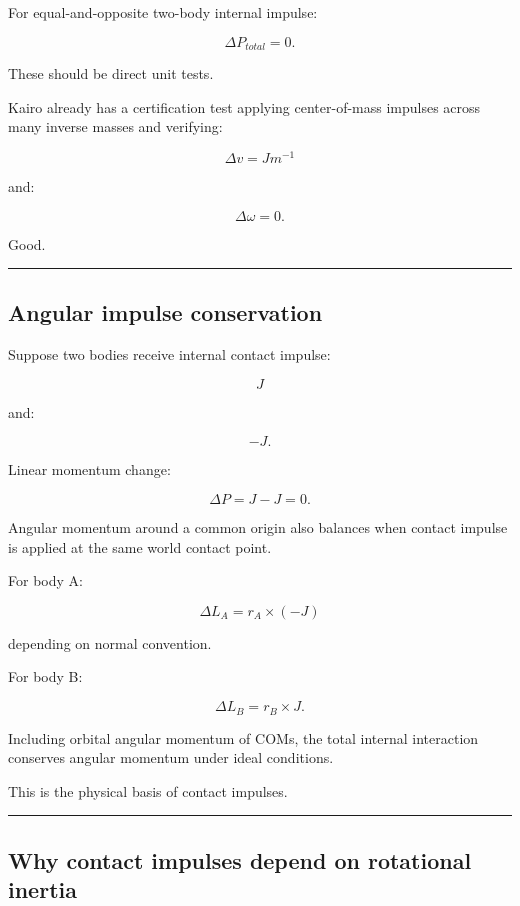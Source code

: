 For equal-and-opposite two-body internal impulse:

\[
\Delta P_{total}=0.
\]

These should be direct unit tests.

Kairo already has a certification test applying center-of-mass impulses across many inverse masses and verifying:

\[
\Delta v=Jm^{-1}
\]

and:

\[
\Delta\omega=0.
\]

Good.

\begin{center}\rule{0.5\linewidth}{0.5pt}\end{center}

\subsection{Angular impulse conservation}\label{06-engine-ii-ch038-angular-impulse-conservation}

\hypertarget{06-engine-ii-ch038-angular-impulse-conservation}{}

Suppose two bodies receive internal contact impulse:

\[
J
\]

and:

\[
-J.
\]

Linear momentum change:

\[
\Delta P
=
J-J
=
0.
\]

Angular momentum around a common origin also balances when contact impulse is applied at the same world contact point.

For body A:

\[
\Delta L_A
=
r_A\times(-J)
\]

depending on normal convention.

For body B:

\[
\Delta L_B
=
r_B\times J.
\]

Including orbital angular momentum of COMs, the total internal interaction conserves angular momentum under ideal conditions.

This is the physical basis of contact impulses.

\begin{center}\rule{0.5\linewidth}{0.5pt}\end{center}

\subsection{Why contact impulses depend on rotational inertia}\label{06-engine-ii-ch038-why-contact-impulses-depend-on-rotational-inertia}

